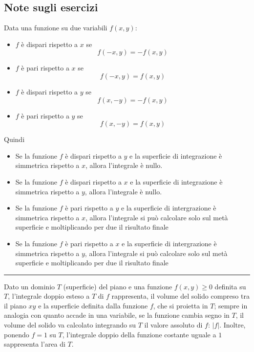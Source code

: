 \subsection{Note sugli esercizi}
Data una funzione su due variabili $f(x,y)$:
\begin{itemize}
    \item $f$ è dispari rispetto a $x$ se 
    \[
        f(-x,y) = -f(x,y)
    \]
    \item $f$ è pari rispetto a $x$ se 
    \[
        f(-x,y) = f(x,y)
    \]
    \item $f$ è dispari rispetto a $y$ se 
    \[
        f(x,-y) = -f(x,y)
    \]
    \item $f$ è pari rispetto a $y$ se 
    \[
        f(x,-y) = f(x,y)
    \]
\end{itemize}
Quindi
\begin{tcolorbox}
\begin{itemize}
    \item Se la funzione $f$ è dispari rispetto a $y$ e la superficie di integrazione è simmetrica rispetto a $x$, allora l'integrale è nullo.
    \item Se la funzione $f$ è dispari rispetto a $x$ e la superficie di integrazione è simmetrica rispetto a $y$, allora l'integrale è nullo.
    \item Se la funzione $f$ è pari rispetto a $y$ e la superficie di intergrazione è simmetrica rispetto a $x$, allora l'integrale si può calcolare solo sul metà superficie e moltiplicando per due il risultato finale    \item Se la funzione $f$ è pari rispetto a $x$ e la superficie di intergrazione è simmetrica rispetto a $y$, allora l'integrale si può calcolare solo sul metà superficie e moltiplicando per due il risultato finale
\end{itemize}
\end{tcolorbox}
\rule{\textwidth}{0,4pt}\newline
\begin{tcolorbox}
Dato un dominio $T$ (superficie) del piano e una funzione $f(x,y) \geq 0$ definita su $T$, l'integrale doppio esteso a $T$ di $f$ rappresenta, il volume del solido compreso tra il piano $xy$ e la superficie definita dalla funzione $f$, che si proietta in $T$; sempre in analogia con quanto accade in una variabile, se la funzione cambia segno in $T$, il volume del solido va calcolato integrando su $T$ il valore assoluto di $f$: $|f|$. Inoltre, ponendo $f = 1$ su $T$, l'integrale doppio della funzione costante uguale a $1$ sappresenta l'area di $T$.
\end{tcolorbox}
